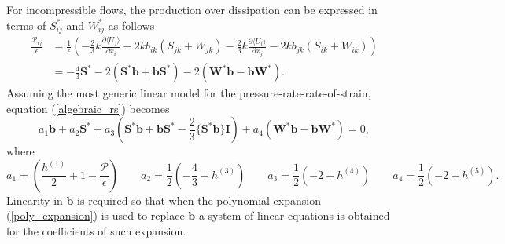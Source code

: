 \documentclass[oneside,a4paper,11pt]{report}
\newcommand{\Stau}{S^*}
\newcommand{\Wtau}{W^*}
\newcommand{\uiavg}{\langle U_i \rangle}
\newcommand{\ujavg}{\langle U_j \rangle}
\begin{document}
For incompressible flows, the production over dissipation can be expressed in terms of $\Stau_{ij}$ and $\Wtau_{ij}$ as follows
\begin{align}
\frac{\mathcal{P}_{ij}}{\epsilon} &= \frac{1}{\epsilon} \left (-\frac{2}{3} k \frac{\partial \ujavg}{\partial x_i} - 2kb_{ik}(S_{jk} + W_{jk}) - \frac{2}{3} k \frac{\partial \uiavg}{\partial x_j} - 2kb_{jk}(S_{ik} + W_{ik}) \right ) \nonumber \\
& = -\frac{4}{3} \mathbf{\Stau} - 2( \mathbf{\Stau} \mathbf{b} + \mathbf{b} \mathbf{\Stau}) - 2 (\mathbf{\Wtau} \mathbf{b} - \mathbf{b} \mathbf{\Wtau} ).
\end{align}
Assuming the most generic linear model for the pressure-rate-rate-of-strain, equation (\ref{algebraic_rs}) becomes
\begin{equation}
a_1 \mathbf{b} + a_2 \mathbf{\Stau} + a_3 \left (\mathbf{\Stau} \mathbf{b} + \mathbf{b} \mathbf{\Stau} - \frac{2}{3} \{ \mathbf{\Stau} \mathbf{b} \} \mathbf{I} \right) + a_4 (\mathbf{\Wtau} \mathbf{b} - \mathbf{b} \mathbf{\Wtau}) = 0,
\end{equation}
where
\begin{equation}
a_1 = \left ( \frac{h^{(1)}}{2} +1 - \frac{\mathcal{P}}{\epsilon} \right ) \qquad a_2 = \frac{1}{2} \left (-\frac{4}{3} + h^{(3)} \right ) \qquad a_3 = \frac{1}{2} \left (-2 + h^{(4)} \right ) \qquad a_4 = \frac{1}{2} \left (-2 + h^{(5)} \right ).
\end{equation}
Linearity in $\mathbf{b}$ is required so that when the polynomial expansion (\ref{poly_expansion}) is used to replace $\mathbf{b}$ a system of linear equations is obtained for the coefficients of such expansion.
\end{document}
